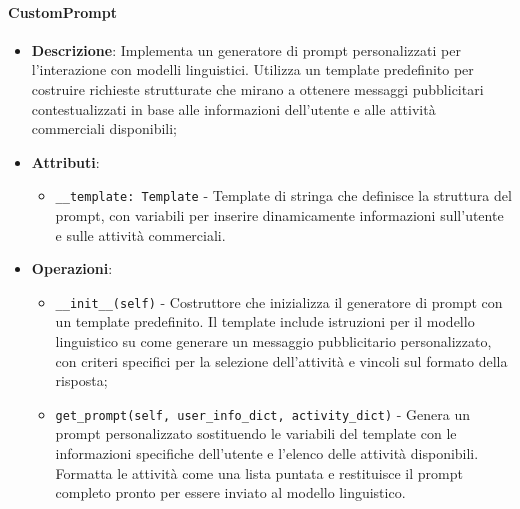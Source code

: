 \documentclass[10pt]{article}
\begin{document}
    \paragraph{CustomPrompt}
    \begin{itemize} 
    \item \textbf{Descrizione}: Implementa un generatore di prompt personalizzati per l'interazione con modelli linguistici. Utilizza un template predefinito per costruire richieste strutturate che mirano a ottenere messaggi pubblicitari contestualizzati in base alle informazioni dell'utente e alle attività commerciali disponibili;
    \item \textbf{Attributi}:
    \begin{itemize}
        \item \texttt{\_\_template: Template} - Template di stringa che definisce la struttura del prompt, con variabili per inserire dinamicamente informazioni sull'utente e sulle attività commerciali.
    \end{itemize}
    
    \item \textbf{Operazioni}:
    \begin{itemize}
        \item \texttt{\_\_init\_\_(self)} - Costruttore che inizializza il generatore di prompt con un template predefinito. Il template include istruzioni per il modello linguistico su come generare un messaggio pubblicitario personalizzato, con criteri specifici per la selezione dell'attività e vincoli sul formato della risposta;
        
        \item \texttt{get\_prompt(self, user\_info\_dict, activity\_dict)} - Genera un prompt personalizzato sostituendo le variabili del template con le informazioni specifiche dell'utente e l'elenco delle attività disponibili. Formatta le attività come una lista puntata e restituisce il prompt completo pronto per essere inviato al modello linguistico.
    \end{itemize}
    \end{itemize}
\end{document}
